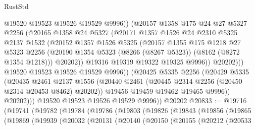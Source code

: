 \begin{lexlean}{RustStd}
\begin{coremodule}
                        @19520
                        @19523
                        @19526
                        @19529
                        @9996))
                    (@20157
                      @1358
                      @175
                      @24
                      @27
                      @5327
                      @2256
                      (@20165
                        @1358
                        @24
                        @5327
                        (@20171
                          @1357
                          @1526
                          @24
                          @2310
                          @5325
                          @2137
                          @1532
                          (@20152
                            @1357
                            @1526
                            @5325
                            (@20157
                              @1355
                              @175
                              @1218
                              @27
                              @5323
                              @2256
                              (@20190 @1354 @5323 (@8266 (@8267 @5323)) (@8162 (@8272 @1354 @1218)))
                              @20202))
                          @19316
                          @19319
                          @19322
                          @19325
                          @9996))
                      @20202)))
                @19520
                @19523
                @19526
                @19529
                @9996))
            (@20425
              @5335
              @2256
              (@20429
                @5335
                (@20435
                  @2461
                  @2137
                  @1556
                  (@20440 @2461 (@20445 @2314 @2256 (@20450 @2314 @20453 @8462) @20202))
                  @19456
                  @19459
                  @19462
                  @19465
                  @9996))
              @20202)))
        @19520
        @19523
        @19526
        @19529
        @9996))
    @20202
@20833 := @19716
    (@19741
      (@19782
        (@19784
          (@19786
            (@19803
              (@19826
                (@19843
                  (@19856
                    (@19865
                      (@19869
                        (@19939
                          (@20032
                            (@20131
                              (@20140
                                (@20150
                                  (@20155
                                    (@20212
                                      (@20533

\end{coremodule}
\end{lexlean}
